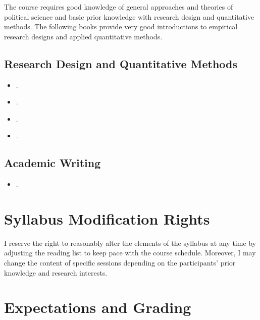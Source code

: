 \documentclass[abstract=on,parskip=full,headings=standardclasses,fontsize=11pt,paper=a4]{scrartcl}
\begin{document}
The course requires good knowledge of general approaches and theories of political science and basic prior knowledge with research design and quantitative methods. The following books provide very good introductions to empirical research designs and applied quantitative methods.

\subsection*{Research Design and Quantitative Methods}
\begin{itemize}
\item {}.
\item {}.
\item {}.
\item {}.
\end{itemize}

\subsection*{Academic Writing}
\begin{itemize}
\item {}.
\end{itemize}


\section*{Syllabus Modification Rights}

I reserve the right to reasonably alter the elements of the syllabus at any time by adjusting the reading list to keep pace with the course schedule. Moreover, I may change the content of specific sessions depending on the participants' prior knowledge and research interests.


\section*{Expectations and Grading}
\end{document}
